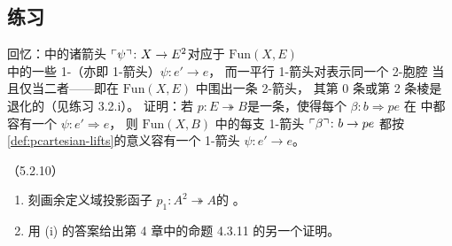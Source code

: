 \subsection*{练习}

\begin{exercise}\label{ex:homotopy-lifting}
回忆：\trInfinityCosmos{}中的诸箭头 $\ulcorner\psi\urcorner\colon X\to E^{2}$对应于\trFunctorSpace{}
$\mathrm{Fun}(X,E)$ 中的一些 1-\trSimplex{}（亦即 1-箭头）$\psi\colon e'\to e$，
而一平行 1-箭头对表示同一个 2-胞腔
当且仅当二者\trHomotopic——即在 $\mathrm{Fun}(X,E)$ 中围出一条 2-箭头，
其第 0 条或第 2 条棱是退化的（见练习 3.2.i）。
证明：若 $p\colon E\twoheadrightarrow B$是一条\trIsofibration，使得每个%
\trNaturalTransformation{} $\beta\colon b\Rightarrow pe$ 在%
\trHomotopyTwoCategory{}中都容有一个\trLifting{} $\psi\colon e'\Rightarrow e$，
则 $\mathrm{Fun}(X,B)$ 中的每支 1-箭头 $\ulcorner\beta\urcorner\colon b\to pe$ 都按%
\cref{def:pcartesian-lifts}的意义容有一个 1-箭头\trLifting{} $\psi\colon e'\to e$。
\end{exercise}

\begin{exercise}\label{ex:codomain-projection-cartesian-arrows}
（5.2.10）
\begin{enumerate}[label=(\roman*)]
\item 刻画余定义域投影函子 $p_{1}\colon A^{2}\twoheadrightarrow A$的%
\trCartesianArrow。
\item 用 (i) 的答案给出第 4 章中的命题 4.3.11 的另一个证明。
\end{enumerate}
\end{exercise}
